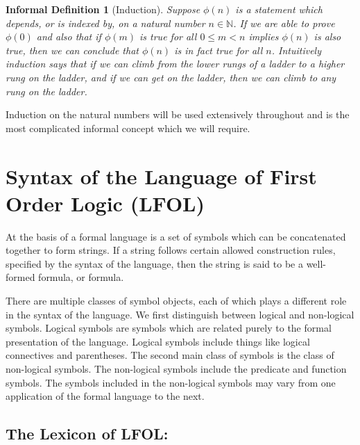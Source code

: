 \documentclass[12pt]{article}
\theoremstyle{break}
\theoremstyle{break}
\theoremstyle{break}
\theoremstyle{break}
\theoremstyle{break}
\newtheorem{informal definition}[definition]{Informal Definition}
\begin{document}
\begin{informal definition}[Induction]
Suppose $\phi(n)$ is a statement which depends, or is indexed by, on a natural number $n\in\mathbb{N}$.
If we are able to prove $\phi(0)$ and also that if $\phi(m)$ is true for all $0\le m < n$ implies $\phi(n)$ is also true, then we can conclude that $\phi(n)$ is in fact true for all $n$.
Intuitively induction says that if we can climb from the lower rungs of a ladder to a higher rung on the ladder, and if we can get on the ladder, then we can climb to any rung on the ladder.
\end{informal definition}
Induction on the natural numbers will be used extensively throughout and is the most complicated informal concept which we will require.


\newpage
\section{Syntax of the Language of First Order Logic (LFOL)}

At the basis of a formal language is a set of symbols which can be concatenated together to form strings.
If a string follows certain allowed construction rules, specified by the syntax of the language, then the string is said to be a well-formed formula, or formula.

There are multiple classes of symbol objects, each of which plays a different role in the syntax of the language.
We first distinguish between logical and non-logical symbols.
Logical symbols are symbols which are related purely to the formal presentation of the language.
Logical symbols include things like logical connectives and parentheses.
The second main class of symbols is the class of non-logical symbols.
The non-logical symbols include the predicate and function symbols.
The symbols included in the non-logical symbols may vary from one application of the formal language to the next.


\subsection{The Lexicon of LFOL:}
\end{document}
